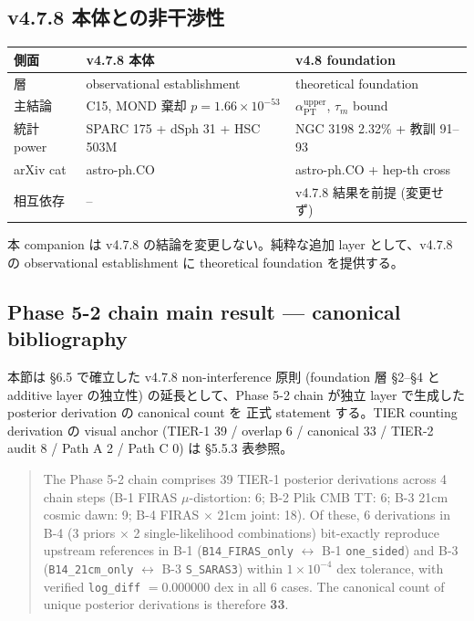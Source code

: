 \documentclass[11pt,a4paper]{ltjsarticle}
\newcommand{\aPT}{\alpha_{\mathrm{PT}}}
\newcommand{\taum}{\tau_{m}}
\begin{document}
\subsection{v4.7.8 本体との非干渉性}
\begin{center}\small
\begin{tabular}{@{}lll@{}}
\toprule
側面 & v4.7.8 本体 & v4.8 foundation \\
\midrule
層 & observational establishment & theoretical foundation \\
主結論 & C15, MOND 棄却 $p = 1.66 \times 10^{-53}$ & $\aPT^{\mathrm{upper}}$, $\taum$ bound \\
統計 power & SPARC 175 + dSph 31 + HSC 503M & NGC 3198 2.32\% + 教訓 91--93 \\
arXiv cat & astro-ph.CO & astro-ph.CO + hep-th cross \\
相互依存 & -- & v4.7.8 結果を前提 (変更せず) \\
\bottomrule
\end{tabular}
\end{center}

本 companion は v4.7.8 の結論を変更しない。純粋な追加 layer として、v4.7.8 の observational
establishment に theoretical foundation を提供する。



\subsection{Phase 5-2 chain main result --- canonical bibliography}

本節は \S 6.5 で確立した v4.7.8 non-interference 原則 (foundation 層
\S 2--\S 4 と additive layer の独立性) の延長として、Phase 5-2 chain
が独立 layer で生成した posterior derivation の canonical count を
正式 statement する。TIER counting derivation の visual anchor
(TIER-1 39 / overlap 6 / canonical 33 / TIER-2 audit 8 / Path A 2 /
Path C 0) は \S 5.5.3 表参照。

\begin{quote}
The Phase 5-2 chain comprises 39 TIER-1 posterior derivations across
4 chain steps (B-1 FIRAS $\mu$-distortion: 6;
B-2 Plik CMB TT: 6;
B-3 21cm cosmic dawn: 9;
B-4 FIRAS $\times$ 21cm joint: 18).
Of these, 6 derivations in B-4 (3 priors $\times$ 2 single-likelihood
combinations) bit-exactly reproduce upstream references in B-1
(\texttt{B14\_FIRAS\_only} $\leftrightarrow$ B-1 \texttt{one\_sided}) and
B-3 (\texttt{B14\_21cm\_only} $\leftrightarrow$ B-3 \texttt{S\_SARAS3})
within $1 \times 10^{-4}$ dex tolerance, with verified
\texttt{log\_diff} $= 0.000000$ dex in all 6 cases. The canonical count
of unique posterior derivations is therefore \textbf{33}.
\end{quote}
\end{document}
